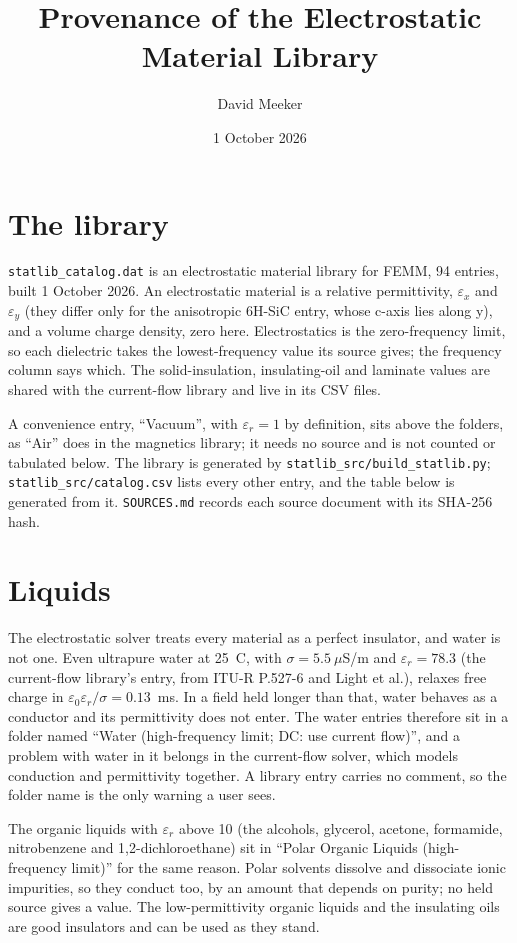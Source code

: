 \documentclass[10pt]{article}
\title{Provenance of the Electrostatic Material Library}
\author{David Meeker}
\date{1 October 2026}
\begin{document}
\maketitle

\section*{The library}

\texttt{statlib\_catalog.dat} is an electrostatic material library for FEMM, 94 entries, built 1 October 2026. An electrostatic material is a relative permittivity, $\varepsilon_x$ and $\varepsilon_y$ (they differ only for the anisotropic 6H-SiC entry, whose c-axis lies along y), and a volume charge density, zero here. Electrostatics is the zero-frequency limit, so each dielectric takes the lowest-frequency value its source gives; the frequency column says which. The solid-insulation, insulating-oil and laminate values are shared with the current-flow library and live in its CSV files.

A convenience entry, ``Vacuum'', with $\varepsilon_r = 1$ by definition, sits above the folders, as ``Air'' does in the magnetics library; it needs no source and is not counted or tabulated below. The library is generated by \texttt{statlib\_src/\allowbreak build\_statlib.py}; \texttt{statlib\_src/\allowbreak catalog.csv} lists every other entry, and the table below is generated from it. \texttt{SOURCES.md} records each source document with its SHA-256 hash.

\section*{Liquids}

The electrostatic solver treats every material as a perfect insulator, and water is not one. Even ultrapure water at 25~\textdegree C, with $\sigma = 5.5\ \mu$S/m and $\varepsilon_r = 78.3$ (the current-flow library's entry, from ITU-R P.527-6 and Light et al.), relaxes free charge in $\varepsilon_0\varepsilon_r/\sigma = 0.13$~ms. In a field held longer than that, water behaves as a conductor and its permittivity does not enter. The water entries therefore sit in a folder named ``Water (high-frequency limit; DC: use current flow)'', and a problem with water in it belongs in the current-flow solver, which models conduction and permittivity together. A library entry carries no comment, so the folder name is the only warning a user sees.

The organic liquids with $\varepsilon_r$ above 10 (the alcohols, glycerol, acetone, formamide, nitrobenzene and 1,2-di\-chloro\-ethane) sit in ``Polar Organic Liquids (high-frequency limit)'' for the same reason. Polar solvents dissolve and dissociate ionic impurities, so they conduct too, by an amount that depends on purity; no held source gives a value. The low-permittivity organic liquids and the insulating oils are good insulators and can be used as they stand.
\end{document}
